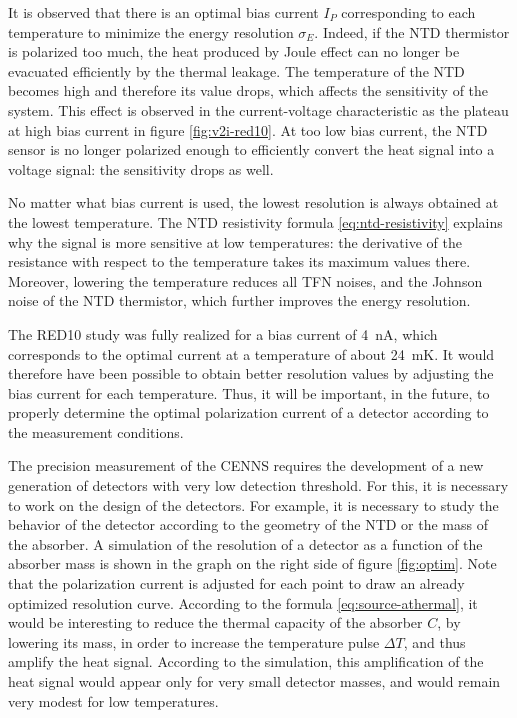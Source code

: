 It is observed that there is an optimal bias current $I_P$ corresponding to each temperature to minimize the energy resolution $\sigma_E$. Indeed, if the NTD thermistor is polarized too much, the heat produced by Joule effect can no longer be evacuated efficiently by the thermal leakage. The temperature of the NTD becomes high and therefore its value drops, which affects the sensitivity of the system. This effect is observed in the current-voltage characteristic as the plateau at high bias current in figure \ref{fig:v2i-red10}. At too low bias current, the NTD sensor is no longer polarized enough to efficiently convert the heat signal into a voltage signal: the sensitivity drops as well.

No matter what bias current is used, the lowest resolution is always obtained at the lowest temperature. The NTD resistivity formula \ref{eq:ntd-resistivity} explains why the signal is more sensitive at low temperatures: the derivative of the resistance with respect to the temperature takes its maximum values there. Moreover, lowering the temperature reduces all TFN noises, and the Johnson noise of the NTD thermistor, which further improves the energy resolution.

The RED10 study was fully realized for a bias current of \SI{4}{\nano\ampere}, which corresponds to the optimal current at a temperature of about \SI{24}{\milli\kelvin}. It would therefore have been possible to obtain better resolution values by adjusting the bias current for each temperature. Thus, it will be important, in the future, to properly determine the optimal polarization current of a detector according to the measurement conditions.

The precision measurement of the CENNS requires the development of a new generation of detectors with very low detection threshold. For this, it is necessary to work on the design of the detectors. For example, it is necessary to study the behavior of the detector according to the geometry of the NTD or the mass of the absorber.
A simulation of the resolution of a detector as a function of the absorber mass is shown in the graph on the right side of figure \ref{fig:optim}. Note that the polarization current is adjusted for each point to draw an already optimized resolution curve. According to the formula \ref{eq:source-athermal}, it would be interesting to reduce the thermal capacity of the absorber $C$, by lowering its mass, in order to increase the temperature pulse $\Delta T$, and thus amplify the heat signal. According to the simulation, this amplification of the heat signal would appear only for very small detector masses, and would remain very modest for low temperatures. 

